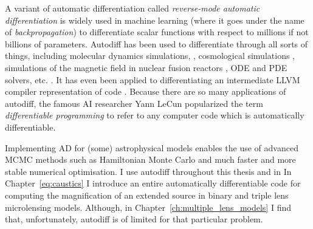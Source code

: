 \documentclass[12pt,dvipsnames]{report}
\begin{document}
A variant of automatic differentiation called \emph{reverse-mode automatic differentiation}
is widely used in machine learning (where it goes under the name of 
\emph{backpropagation}) to differentiate scalar functions with respect to 
millions if not billions of parameters. 
Autodiff has been used to differentiate through all sorts of things, including 
molecular dynamics simulations, \citep{arXiv:1912.04232}, cosmological simulations 
\citep{2016MNRAS.463.2273F}, simulations of the magnetic field in nuclear fusion 
reactors \citep{arXiv:2009.00196}, ODE and PDE solvers, etc. . It has even been 
applied to differentiating an intermediate LLVM compiler representation of code 
\citep{arXiv:2010.01709}.
Because there are so many applications of autodiff,
the famous AI researcher Yann LeCun popularized the term 
\emph{differentiable programming} to refer to any computer code which is 
automatically differentiable.

Implementing AD for (some) astrophysical models enables the use of advanced MCMC methods such as 
Hamiltonian Monte Carlo and much faster and more stable numerical optimisation.
I use autodiff throughout this thesis and in 
In Chapter~\ref{eq:caustics} I introduce an entire automatically differentiable code for 
computing the magnification of an extended source in binary and triple lens microlensing
models. Although, in Chapter~\ref{ch:multiple_lens_models} I find that, unfortunately, 
autodiff is of limited for that particular problem.
\end{document}
